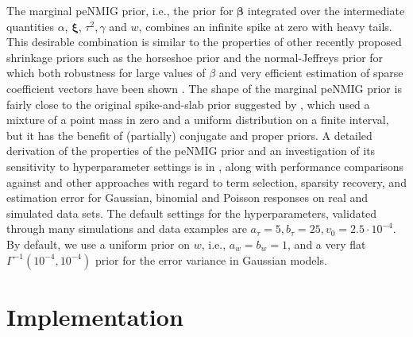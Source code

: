 \documentclass[article, shortnames, nojss, noheadings, notitle]{jss}
\begin{document}
The marginal peNMIG prior, i.e., the prior for $\bm\beta$ integrated over
the intermediate quantities $\alpha$, $\bm \xi$, $\tau^2, \gamma$ and $w$,
combines an infinite spike at zero with heavy
tails. This desirable combination is similar to the properties of
other recently proposed shrinkage
priors such as the horseshoe prior \citep{Carvalho:2010} and the
normal-Jeffreys prior \citep{Bae:Mallick:2004} for which both
robustness for large values of $\beta$ and very efficient estimation
of sparse coefficient vectors have been shown
\citep{Polson:Scott:2010}.
The shape of the marginal peNMIG prior is fairly close to the
original spike-and-slab prior suggested by
\citet{Mitchell:Beauchamp:1988}, which used a mixture of a point
mass in zero and a uniform distribution on a finite interval, but
it has the benefit of (partially) conjugate and proper
priors. A detailed derivation of the properties of the peNMIG prior
and an investigation of its sensitivity to hyperparameter settings
is in \citet{Scheipl:2010}, along with
performance comparisons against 
and other approaches with regard to
term selection, sparsity recovery, and
estimation error for Gaussian, binomial and Poisson responses on
real and simulated data sets.
The default settings for the hyperparameters, validated through many simulations and
data examples are $a_\tau=5, b_\tau=25, v_0=2.5\cdot10^{-4}$. By default,
we use a uniform prior on $w$, i.e., $a_w=b_w=1$, and a very flat $\Gamma^{-1}(10^{-4},10^{-4})$ prior
for the error variance in Gaussian models.



\section{Implementation}\label{implementation}
\end{document}

